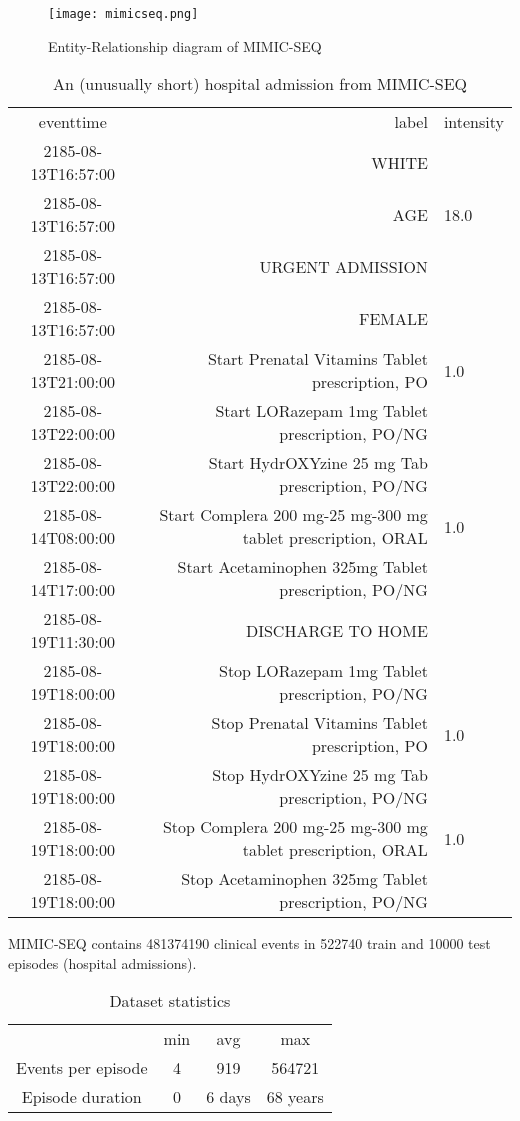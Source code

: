 \begin{figure}
    \centering
    \texttt{[image: mimicseq.png]}
    \caption{Entity-Relationship diagram of MIMIC-SEQ}
    \label{fig:enter-label}
\end{figure}

\begin{table}[H]
    \centering
    \scriptsize
    \begin{tabular}{c|r|l}
    eventtime &	label &	intensity \\
    2185-08-13T16:57:00 &	WHITE	 & \\
    2185-08-13T16:57:00 &	AGE &	18.0 \\
    2185-08-13T16:57:00 &	URGENT ADMISSION &	 \\
    2185-08-13T16:57:00 &	FEMALE &	 \\
    2185-08-13T21:00:00 &	Start Prenatal Vitamins Tablet prescription, PO &	1.0 \\
    2185-08-13T22:00:00 &	Start LORazepam 1mg Tablet prescription, PO/NG &	 \\
    2185-08-13T22:00:00 &	Start HydrOXYzine 25 mg Tab prescription, PO/NG &	 \\
    2185-08-14T08:00:00 &	Start Complera 200 mg-25 mg-300 mg tablet prescription, ORAL &	1.0 \\
    2185-08-14T17:00:00 &	Start Acetaminophen 325mg Tablet prescription, PO/NG &	 \\
    2185-08-19T11:30:00 &	DISCHARGE TO HOME &	 \\
    2185-08-19T18:00:00 &	Stop LORazepam 1mg Tablet prescription, PO/NG &	 \\
    2185-08-19T18:00:00 &	Stop Prenatal Vitamins Tablet prescription, PO &	1.0 \\
    2185-08-19T18:00:00 &	Stop HydrOXYzine 25 mg Tab prescription, PO/NG &	 \\
    2185-08-19T18:00:00 &	Stop Complera 200 mg-25 mg-300 mg tablet prescription, ORAL &	1.0 \\
    2185-08-19T18:00:00 &	Stop Acetaminophen 325mg Tablet prescription, PO/NG &	 \\
    \end{tabular}
    \caption{An (unusually short) hospital admission from MIMIC-SEQ}
\end{table}

MIMIC-SEQ contains 481374190 clinical events in 522740 train and 10000 test episodes (hospital admissions).

\begin{table}[H]
    \centering
    \begin{tabular}{c|c|c|c}
         & min & avg & max \\
         Events per episode & 4 & 919 & 564721 \\
         Episode duration & 0 & 6 days & 68 years \\
    \end{tabular}
    \caption{Dataset statistics}
    \label{tab:stats}
\end{table}

